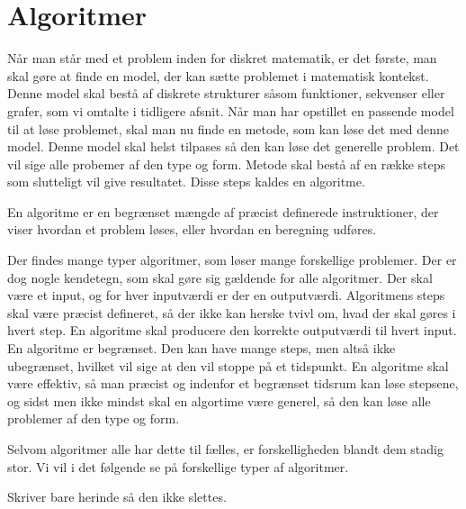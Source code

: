 \chapter{Algoritmer} \label{kap.algo}
Når man står med et problem inden for diskret matematik, er det første, man skal gøre at finde en model, der kan sætte problemet i matematisk kontekst. Denne model skal bestå af diskrete strukturer såsom funktioner, sekvenser eller grafer, som vi omtalte i tidligere afsnit. Når man har opstillet en passende model til at løse problemet, skal man nu finde en metode, som kan løse det med denne model. Denne model skal helst tilpases så den kan løse det generelle problem. Det vil sige alle probemer af den type og form. Metode skal bestå af en række steps som slutteligt vil give resultatet. Disse steps kaldes en algoritme. 
\begin{defn}
[Algoritmer] En algoritme er en begrænset mængde af præcist definerede instruktioner, der viser hvordan et problem løses, eller hvordan en beregning udføres. 

\end{defn}
Der findes mange typer algoritmer, som løser mange forskellige problemer. Der er dog nogle kendetegn, som skal gøre sig gældende for alle algoritmer. Der skal være et input, og for hver inputværdi er der en outputværdi. Algoritmens steps skal være præcist defineret, så der ikke kan herske tvivl om, hvad der skal gøres i hvert step. En algoritme skal producere den korrekte outputværdi til hvert input. En algoritme er begrænset. Den kan have mange steps, men altså ikke ubegrænset, hvilket vil sige at den vil stoppe på et tidspunkt. En algoritme skal være effektiv, så man præcist og indenfor et begrænset tidsrum kan løse stepsene, og sidst men ikke mindst skal en algortime være generel, så den kan løse alle problemer af den type og form.

Selvom algoritmer alle har dette til fælles, er forskelligheden blandt dem stadig stor. Vi vil i det følgende se på forskellige typer af algoritmer.





Skriver bare herinde så den ikke slettes.